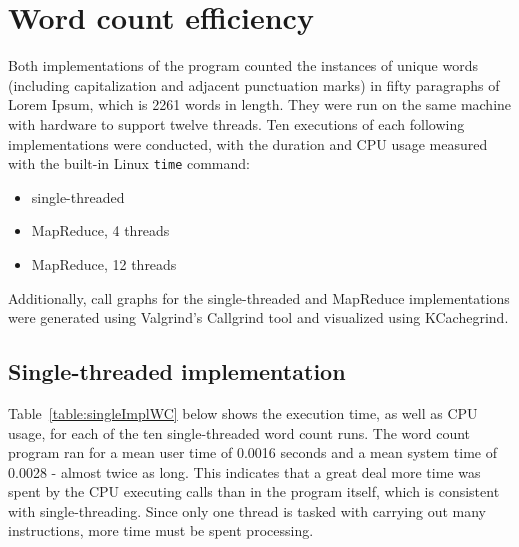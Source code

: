 \documentclass[12pt, letterpaper]{article}
\begin{document}
\section{Word count efficiency}
	Both implementations of the program counted the instances of unique words (including capitalization and adjacent punctuation marks) in fifty paragraphs of Lorem Ipsum, which is 2261 words in length. They were run on the same machine with hardware to support twelve threads. Ten executions of each following implementations were conducted, with the duration and CPU usage measured with the built-in Linux \texttt{time} command:
	\begin{itemize}
	\item{single-threaded}
	\item{MapReduce, 4 threads}
	\item{MapReduce, 12 threads}
	\end{itemize}
	Additionally, call graphs for the single-threaded and MapReduce implementations were generated using Valgrind's Callgrind tool and visualized using KCachegrind.
\subsection{Single-threaded implementation}
	Table~\ref{table:singleImplWC} below shows the execution time, as well as CPU usage, for each of the ten single-threaded word count runs. The word count program ran for a mean user time of 0.0016 seconds and a mean system time of 0.0028 - almost twice as long. This indicates that a great deal more time was spent by the CPU executing calls than in the program itself, which is consistent with single-threading. Since only one thread is tasked with carrying out many instructions, more time must be spent processing.
	
\end{document}
